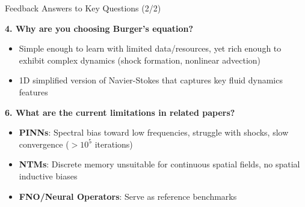 \begin{frame}{Feedback}
    \small
    \textcolor{red_unipd}{\Large Answers to Key Questions (2/2)}
    \vspace{0.3em}

    \scriptsize
    \textbf{4. Why are you choosing Burger's equation?}
    \begin{itemize}
        \item Simple enough to learn with limited data/resources, yet rich enough to exhibit complex dynamics (shock formation, nonlinear advection)
        \item 1D simplified version of Navier-Stokes that captures key fluid dynamics features
    \end{itemize}

    \vspace{0.5em}
    \textbf{6. What are the current limitations in related papers?}
    \begin{itemize}
        \item \textbf{PINNs}: Spectral bias toward low frequencies, struggle with shocks, slow convergence ($>10^5$ iterations)
        \item \textbf{NTMs}: Discrete memory unsuitable for continuous spatial fields, no spatial inductive biases
        \item \textbf{FNO/Neural Operators}: Serve as reference benchmarks
    \end{itemize}
\end{frame}
